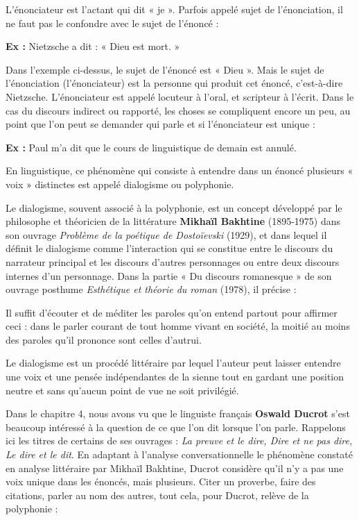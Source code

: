 L’énonciateur est l’actant qui dit « je ». Parfois appelé sujet de l’énonciation, il ne faut pas le confondre avec le sujet de l’énoncé :

\textbf{Ex :} Nietzsche a dit : « Dieu est mort. »

Dans l’exemple ci-dessus, le sujet de l’énoncé est « Dieu ». Mais le sujet de l’énonciation (l’énonciateur) est la personne qui produit cet énoncé, c’est-à-dire Nietzsche. L’énonciateur est appelé locuteur à l’oral, et scripteur à l’écrit. Dans le cas du discours indirect ou rapporté, les choses se compliquent encore un peu, au point que l’on peut se demander qui parle et si l’énonciateur est unique :

\textbf{Ex :} Paul m’a dit que le cours de linguistique de demain est annulé.

En linguistique, ce phénomène qui consiste à entendre dans un énoncé plusieurs « voix » distinctes est appelé dialogisme ou polyphonie.

Le dialogisme, souvent associé à la polyphonie, est un concept développé par le philosophe et théoricien de la littérature \textbf{Mikhaïl Bakhtine} (1895-1975) dans son ouvrage \textit{Problème de la poétique de Dostoïevski} (1929), et dans lequel il définit le dialogisme comme l’interaction qui se constitue entre le discours du narrateur principal et les discours d’autres personnages ou entre deux discours internes d’un personnage. Dans la partie « Du discours romanesque » de son ouvrage posthume \textit{Esthétique et théorie du roman} (1978), il précise :

\begin{lecture}{}
Il suffit d’écouter et de méditer les paroles qu’on entend partout pour affirmer ceci : dans le parler courant de tout homme vivant en société, la moitié au moins des paroles qu’il prononce sont celles d’autrui.
\end{lecture}

Le dialogisme est un procédé littéraire par lequel l’auteur peut laisser entendre une voix et une pensée indépendantes de la sienne tout en gardant une position neutre et sans qu’aucun point de vue ne soit privilégié.

Dans le chapitre 4, nous avons vu que le linguiste français \textbf{Oswald Ducrot} s’est beaucoup intéressé à la question de ce que l’on dit lorsque l’on parle. Rappelons ici les titres de certains de ses ouvrages : \textit{La preuve et le dire, Dire et ne pas dire, Le dire et le dit}. En adaptant à l’analyse conversationnelle le phénomène constaté en analyse littéraire par Mikhaïl Bakhtine, Ducrot considère qu’il n’y a pas une voix unique dans les énoncés, mais plusieurs. Citer un proverbe, faire des citations, parler au nom des autres, tout cela, pour Ducrot, relève de la polyphonie :

